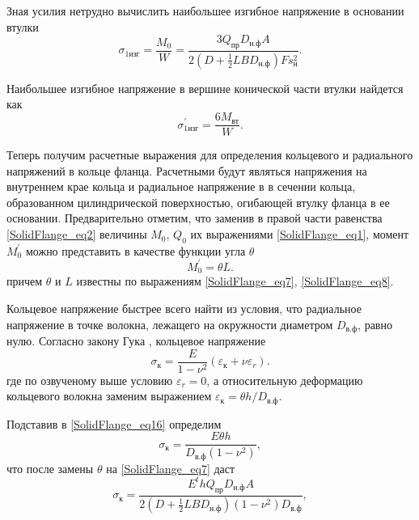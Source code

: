 Зная усилия нетрудно вычислить наибольшее изгибное напряжение в основании втулки 
\begin{equation}
  \label{SolidFlange_eq13}
  {\sigma}_{1{\text{изг}}}= \frac{M_0}{W}= \frac{ 3 Q_{\text{пр}} D_{\text{н.ф}} A}{2 \left( D+ \displaystyle \frac{1}{2} L B D_{\text{н.ф}} \right) F s_{\text{н}}^2}.
\end{equation}

Наибольшее изгибное напряжение в вершине конической части втулки найдется как 
\begin{equation}
  \label{SolidFlange_eq14}
  {\sigma}_{1{\text{изг}}}^{\prime}= \frac{6 M_{\text{вт}}}{W}.
\end{equation}


Теперь получим расчетные выражения для определения кольцевого и радиального напряжений в кольце фланца.
Расчетными будут являться напряжения на внутреннем крае кольца и радиальное напряжение в в сечении кольца, образованном цилиндрической поверхностью, огибающей втулку фланца в ее основании.
Предварительно отметим, что заменив в правой части равенства \eqref{SolidFlange_eq2} величины $M_0$, $Q_0$ их выражениями \eqref{SolidFlange_eq1}, момент $M_0^{\prime}$ можно представить в качестве функции угла $\theta$
\begin{equation}
  \label{SolidFlange_eq15}
  M_0^{\prime}= \theta L.
\end{equation}
причем $\theta$ и $L$ известны по выражениям \eqref{SolidFlange_eq7}, \eqref{SolidFlange_eq8}.

Кольцевое напряжение быстрее всего найти из условия, что радиальное напряжение в точке волокна, лежащего на окружности диаметром $D_{\text{в.ф}}$, равно нулю.
Согласно закону Гука , кольцевое напряжение 
\begin{equation}
  \label{SolidFlange_eq16}
  {\sigma}_{{\text{к}}}= \frac{E}{1- {\nu}^2} \left( {\varepsilon}_{\text{к}} +\nu {\varepsilon}_r \right).
\end{equation}
где по озвученому выше условию ${\varepsilon}_r=0$, а относительную деформацию кольцевого волокна заменим выражением ${\varepsilon}_{\text{к}}= \theta h/D_{\text{в.ф}}$. 

Подставив в \eqref{SolidFlange_eq16} определим 
\begin{equation}
  \label{SolidFlange_eq14}
  {\sigma}_{{\text{к}}}= \frac{E \theta  h}{ D_{\text{в.ф}} \left(1- {\nu}^2 \right)},
\end{equation}
что после замены $\theta$ на \eqref{SolidFlange_eq7} даст 
\begin{equation}
  \label{SolidFlange_eq15}
  {\sigma}_{{\text{к}}}= \frac{E^{t} h Q_{\text{пр}} D_{\text{н.ф}} A}{2 \left( D+ \displaystyle \frac{1}{2} L B D_{\text{н.ф}} \right) \left(1- {\nu}^2 \right) D_{\text{в.ф}}},
\end{equation}

